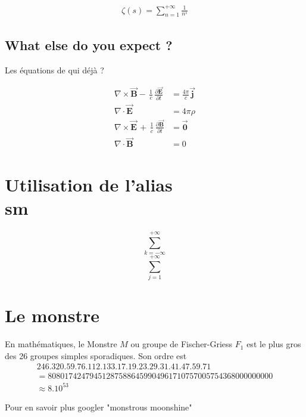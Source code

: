 \documentclass[twocolumn,a4paper]{IEEEtranfr}
\newcommand{\bear}{\begin{eqnarray}}
\newcommand{\ear}{\end{eqnarray}}
\newcommand{\sm}[1]{\sum_{#1=-\infty}^{+\infty}}
\newcommand{\smr}[3]{\sum_{#1=#2}^{#3}}
\newcommand{\smu}[1]{\sum_{#1=1}^{+\infty}}
\begin{document}
\bear
\zeta(s)= \smu{n} \frac{1}{n^s}
\ear

\subsection{What else do you expect ? }

Les équations de qui déjà ?

\begin{equation}
\begin{aligned}
    \nabla \times \vec{\mathbf{B}} -\, \frac1c\,
    \frac{\partial\vec{\mathbf{E}}}{\partial t} & = \frac{4\pi}{c}\vec{\mathbf{j}} \\  
    \nabla \cdot \vec{\mathbf{E}} & = 4 \pi \rho \\
    \nabla \times \vec{\mathbf{E}}\, +\, \frac1c\,
    \frac{\partial\vec{\mathbf{B}}}{\partial t} & = \vec{\mathbf{0}} \\
    \nabla \cdot \vec{\mathbf{B}} & = 0
\end{aligned}
\end{equation}
\section{Utilisation de l'alias \\sm}
$$\sm{k}$$
$$\smr{j}{1}{+\infty}$$
\section{Le monstre}
En mathématiques, le Monstre $M$ ou groupe de Fischer-Griess $F_1$ est le plus gros des 26 groupes simples sporadiques. Son ordre est
\begin{eqnarray*}
246.320.59.76.112.133.17.19.23.29.31.41.47.59.71 \\
= 808 017 424 794 512 875 886 459 904 961 710 757 005 754 368 000 000 000 \\
\approx 8.10^{53}
\end{eqnarray*}

Pour en savoir plus googler "monstrous moonshine"
\end{document}
